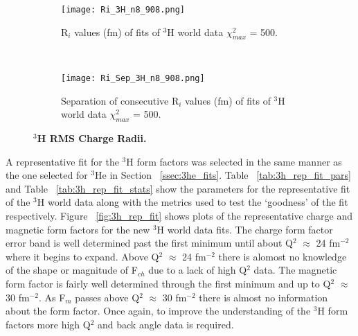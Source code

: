\begin{figure}[!ht]
\begin{subfigure}{1.\textwidth}
  \centering
  \texttt{[image: Ri\_3H\_n8\_908.png]}
  \caption{R$_i$ values (fm) of fits of $^3$H world data $\chi^2_{max}$ = 500.}
  \label{fig:3h_ri_ind}
\end{subfigure}\\
\begin{subfigure}{1.\textwidth}
  \centering
  \texttt{[image: Ri\_Sep\_3H\_n8\_908.png]}
  \caption{Separation of consecutive R$_i$ values (fm) of fits of $^3$H world data $\chi^2_{max}$ = 500.}
  \label{fig:3h_ri_sep}
\end{subfigure}
\caption{\bf{$^3$H RMS Charge Radii.}}
\label{fig:3h_ri}
\end{figure}

A representative fit for the $^3$H form factors was selected in the same manner as the one selected for $^3$He in Section ~\ref{ssec:3he_fits}. Table ~\ref{tab:3h_rep_fit_pars} and Table ~\ref{tab:3h_rep_fit_stats} show the parameters for the representative fit of the $^3$H world data along with the metrics used to test the `goodness' of the fit respectively. Figure ~\ref{fig:3h_rep_fit} shows plots of the representative charge and magnetic form factors for the new $^3$H world data fits. The charge form factor error band is well determined past the first minimum until about Q$^2$ $\approx$ 24 fm$^{-2}$ where it begins to expand. Above Q$^2$ $\approx$ 24 fm$^{-2}$ there is alomost no knowledge of the shape or magnitude of F$_{ch}$ due to a lack of high Q$^2$ data. The magnetic form factor is fairly well determined through the first minimum and up to Q$^2$ $\approx$ 30 fm$^{-2}$. As F$_m$ passes above Q$^2$ $\approx$ 30 fm$^{-2}$ there is almost no information about the form factor. Once again, to improve the understanding of the $^3$H form factors more high Q$^2$ and back angle data is required.

